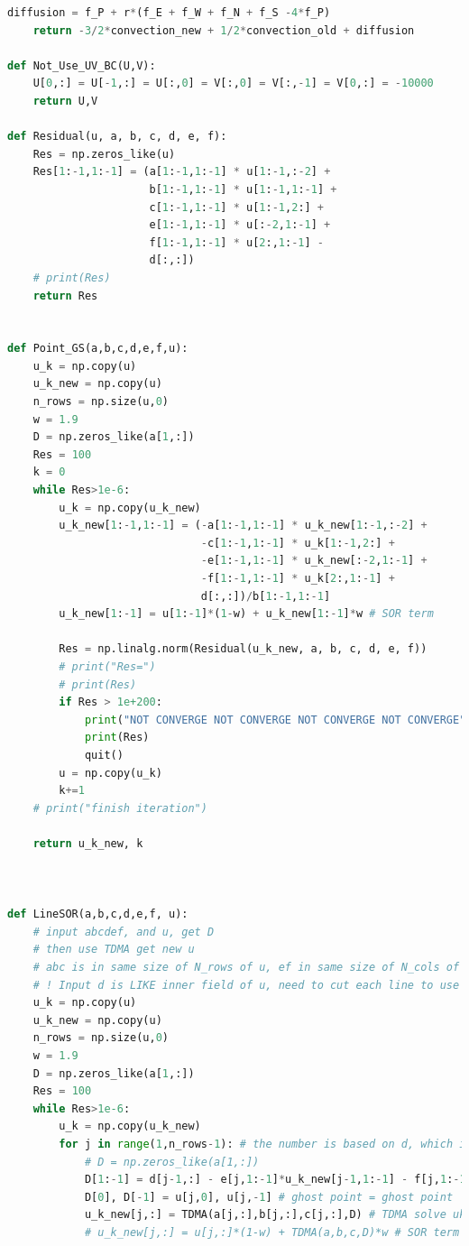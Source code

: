 \documentclass[12pt]{article}
\begin{document}
\begin{scriptsize}
\begin{lstlisting}[language=python,caption={Lid Driven Cavity Solver}]
    diffusion = f_P + r*(f_E + f_W + f_N + f_S -4*f_P)
    return -3/2*convection_new + 1/2*convection_old + diffusion

def Not_Use_UV_BC(U,V):
    U[0,:] = U[-1,:] = U[:,0] = V[:,0] = V[:,-1] = V[0,:] = -10000
    return U,V

def Residual(u, a, b, c, d, e, f):
    Res = np.zeros_like(u)
    Res[1:-1,1:-1] = (a[1:-1,1:-1] * u[1:-1,:-2] +
                      b[1:-1,1:-1] * u[1:-1,1:-1] +
                      c[1:-1,1:-1] * u[1:-1,2:] +
                      e[1:-1,1:-1] * u[:-2,1:-1] +
                      f[1:-1,1:-1] * u[2:,1:-1] -
                      d[:,:])
    # print(Res)
    return Res


def Point_GS(a,b,c,d,e,f,u):
    u_k = np.copy(u)
    u_k_new = np.copy(u)
    n_rows = np.size(u,0)
    w = 1.9
    D = np.zeros_like(a[1,:])
    Res = 100
    k = 0
    while Res>1e-6:
        u_k = np.copy(u_k_new) 
        u_k_new[1:-1,1:-1] = (-a[1:-1,1:-1] * u_k_new[1:-1,:-2] +
                              -c[1:-1,1:-1] * u_k[1:-1,2:] +
                              -e[1:-1,1:-1] * u_k_new[:-2,1:-1] +
                              -f[1:-1,1:-1] * u_k[2:,1:-1] +
                              d[:,:])/b[1:-1,1:-1]
        u_k_new[1:-1] = u[1:-1]*(1-w) + u_k_new[1:-1]*w # SOR term
        
        Res = np.linalg.norm(Residual(u_k_new, a, b, c, d, e, f))
        # print("Res=")
        # print(Res) 
        if Res > 1e+200: 
            print("NOT CONVERGE NOT CONVERGE NOT CONVERGE NOT CONVERGE") 
            print(Res)
            quit()
        u = np.copy(u_k)
        k+=1
    # print("finish iteration")
        
    return u_k_new, k



def LineSOR(a,b,c,d,e,f, u): 
    # input abcdef, and u, get D
    # then use TDMA get new u
    # abc is in same size of N_rows of u, ef in same size of N_cols of u
    # ! Input d is LIKE inner field of u, need to cut each line to use !
    u_k = np.copy(u)
    u_k_new = np.copy(u)
    n_rows = np.size(u,0)
    w = 1.9
    D = np.zeros_like(a[1,:])
    Res = 100
    while Res>1e-6:
        u_k = np.copy(u_k_new) 
        for j in range(1,n_rows-1): # the number is based on d, which is (N-1)x(N-1)
            # D = np.zeros_like(a[1,:])
            D[1:-1] = d[j-1,:] - e[j,1:-1]*u_k_new[j-1,1:-1] - f[j,1:-1]*u_k[j+1,1:-1]
            D[0], D[-1] = u[j,0], u[j,-1] # ghost point = ghost point
            u_k_new[j,:] = TDMA(a[j,:],b[j,:],c[j,:],D) # TDMA solve uk each line
            # u_k_new[j,:] = u[j,:]*(1-w) + TDMA(a,b,c,D)*w # SOR term
        

\end{lstlisting}
\end{scriptsize}
\end{document}
